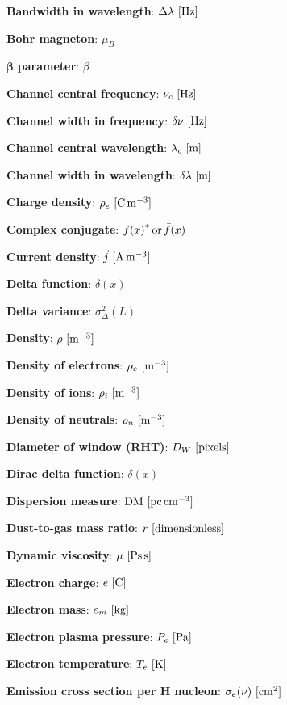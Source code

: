 \documentclass[a4paper,10pt]{article}
\begin{document}
{\noindent}\textbf{Bandwidth in wavelength}: $\Delta\lambda~[{\rm Hz}]$

{\noindent}\textbf{Bohr magneton}: $\mu_B$

{\noindent}$\boldsymbol{\beta}$ \textbf{parameter}: $\beta$

{\noindent}\textbf{Channel central frequency}: $\nu_c~[{\rm Hz}]$

{\noindent}\textbf{Channel width in frequency}: $\delta\nu~[{\rm Hz}]$

{\noindent}\textbf{Channel central wavelength}: $\lambda_c~[{\rm m}]$

{\noindent}\textbf{Channel width in wavelength}: $\delta\lambda~[{\rm m}]$

{\noindent}\textbf{Charge density}: $\rho_e~[{\rm C\,m^{-3}}]$

{\noindent}\textbf{Complex conjugate}: ${f(x)}^*\,{\rm or}\,\bar{f}(x)$

{\noindent}\textbf{Current density}: $\vec{j} ~ [{\rm A\,m^{-3}}]$

{\noindent}\textbf{Delta function}: $\delta (x)$

{\noindent}\textbf{Delta variance}: $\sigma_\Delta^2(L)$

{\noindent}\textbf{Density}: $\rho~[{\rm m^{-3}}]$

{\noindent}\textbf{Density of electrons}: $\rho_e~[{\rm m^{-3}}]$

{\noindent}\textbf{Density of ions}: $\rho_i~[{\rm m^{-3}}]$

{\noindent}\textbf{Density of neutrals}: $\rho_n~[{\rm m^{-3}}]$

{\noindent}\textbf{Diameter of window (RHT)}: $D_W ~ [{\rm pixels}]$

{\noindent}\textbf{Dirac delta function}: $\delta(x)$

{\noindent}\textbf{Dispersion measure}: ${\rm DM} ~ [{\rm pc\,cm^{-3}}]$

{\noindent}\textbf{Dust-to-gas mass ratio}: $r ~ [{\rm dimensionless}]$

{\noindent}\textbf{Dynamic viscosity}: $\mu ~ [{\rm Ps\,s}]$

{\noindent}\textbf{Electron charge}: $e~[{\rm C}]$

{\noindent}\textbf{Electron mass}: $e_m~[{\rm kg}]$

{\noindent}\textbf{Electron plasma pressure}: $P_e~[{\rm Pa}]$

{\noindent}\textbf{Electron temperature}: $T_e~[{\rm K}]$

{\noindent}\textbf{Emission cross section per H nucleon}: $\sigma_e(\nu) ~ [{\rm cm^2}]$
\end{document}
